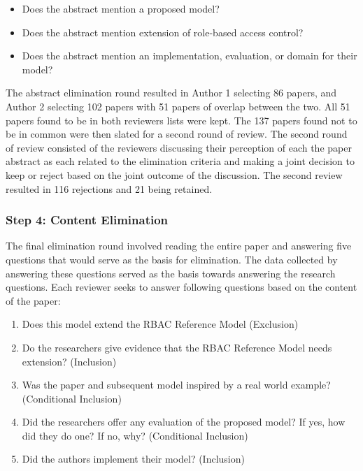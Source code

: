 \begin{itemize}
\setlength{\itemsep}{0.25pt}
\item Does the abstract mention a proposed model?
\item Does the abstract mention extension of role-based access control?
\item Does the abstract mention an implementation, evaluation, or domain for their model?
\end{itemize}

The abstract elimination round resulted in Author 1 selecting 86 papers, and Author 2 selecting 102 papers with 51 papers of overlap between the two. 
All 51 papers found to be in both reviewers lists were kept. 
The 137 papers found not to be in common were then slated for a second round of review. 
The second round of review consisted of the reviewers discussing their perception of each the paper abstract as each related to the elimination criteria and making a joint decision to keep or reject based on the joint outcome of the discussion.
The second review resulted in 116 rejections and 21 being retained.

\subsubsection{Step 4: Content Elimination}

The final elimination round involved reading the entire paper and answering five questions that would serve as the basis for elimination.  The data collected by answering these questions served as the basis towards answering the research questions.  Each reviewer seeks to answer following questions based on the content of the paper:

\begin{enumerate}
\setlength{\itemsep}{0.25pt}
\item Does this model extend the RBAC Reference Model (Exclusion)
\item Do the researchers give evidence that the RBAC Reference Model needs extension? (Inclusion)
\item Was the paper and subsequent model inspired by a real world example?  (Conditional Inclusion)
\item Did the researchers offer any evaluation of the proposed model? If yes, how did they do one? If no, why? (Conditional Inclusion)
\item Did the authors implement their model? (Inclusion)
\end{enumerate}

